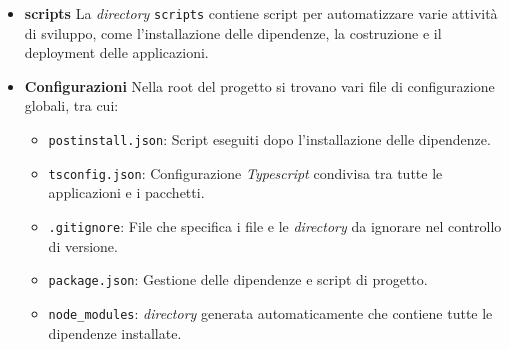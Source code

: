 \begin{itemize}
    \item \textbf{scripts}
    La \textit{directory} \texttt{scripts} contiene script per automatizzare varie attività di sviluppo, come l'installazione delle dipendenze, la costruzione e il deployment delle applicazioni.

    \item \textbf{Configurazioni}
    Nella root del progetto si trovano vari file di configurazione globali, tra cui:
    \begin{itemize}
        \item \texttt{postinstall.json}: Script eseguiti dopo l'installazione delle dipendenze.
        \item \texttt{tsconfig.json}: Configurazione \textit{Typescript} condivisa tra tutte le applicazioni e i pacchetti.
        \item \texttt{.gitignore}: File che specifica i file e le \textit{directory} da ignorare nel controllo di versione.
        \item \texttt{package.json}: Gestione delle dipendenze e script di progetto.
        \item \texttt{node\_modules}: \textit{directory} generata automaticamente che contiene tutte le dipendenze installate.
    \end{itemize}
\end{itemize}
\pagebreak
